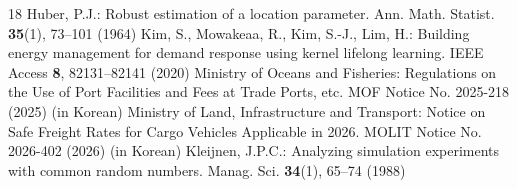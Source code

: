 \documentclass[a4paper]{llncs}
\begin{document}
\begin{thebibliography}{18}
 Huber, P.J.: Robust estimation of a location parameter. Ann. Math. Statist. \textbf{35}(1), 73--101 (1964)
 Kim, S., Mowakeaa, R., Kim, S.-J., Lim, H.: Building energy management for demand response using kernel lifelong learning. IEEE Access \textbf{8}, 82131--82141 (2020)
 Ministry of Oceans and Fisheries: Regulations on the Use of Port Facilities and Fees at Trade Ports, etc. MOF Notice No. 2025-218 (2025) (in Korean)
 Ministry of Land, Infrastructure and Transport: Notice on Safe Freight Rates for Cargo Vehicles Applicable in 2026. MOLIT Notice No. 2026-402 (2026) (in Korean)
 Kleijnen, J.P.C.: Analyzing simulation experiments with common random numbers. Manag. Sci. \textbf{34}(1), 65--74 (1988)
\end{thebibliography}
\end{document}
